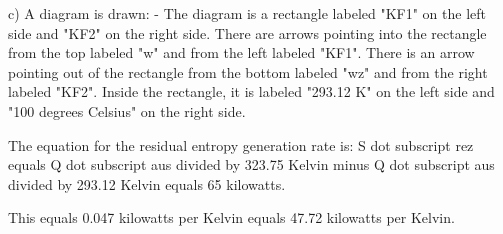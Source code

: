c) A diagram is drawn:
- The diagram is a rectangle labeled "KF1" on the left side and "KF2" on the right side. There are arrows pointing into the rectangle from the top labeled "w" and from the left labeled "KF1". There is an arrow pointing out of the rectangle from the bottom labeled "wz" and from the right labeled "KF2". Inside the rectangle, it is labeled "293.12 K" on the left side and "100 degrees Celsius" on the right side.

The equation for the residual entropy generation rate is:
S dot subscript rez equals Q dot subscript aus divided by 323.75 Kelvin minus Q dot subscript aus divided by 293.12 Kelvin equals 65 kilowatts.

This equals 0.047 kilowatts per Kelvin equals 47.72 kilowatts per Kelvin.